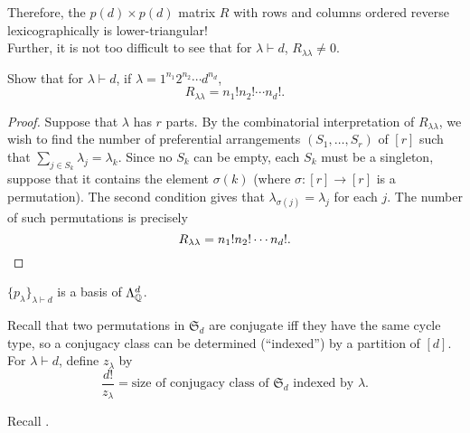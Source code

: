 	Therefore, the $p(d) \times p(d)$ matrix $R$ with rows and columns ordered reverse lexicographically is lower-triangular!\\
	Further, it is not too difficult to see that for $\lambda \vdash d$, $R_{\lambda\lambda} \ne 0$.
	
	\begin{prop}
		Show that for $\lambda \vdash d$, if $\lambda = 1^{n_1}2^{n_2}\cdots d^{n_d}$,
		\[ R_{\lambda\lambda} = n_1! n_2! \cdots n_d!. \]
	\end{prop}
	\begin{proof}
		Suppose that $\lambda$ has $r$ parts. By the combinatorial interpretation of $R_{\lambda\lambda}$, we wish to find the number of preferential arrangements $(S_1,\ldots,S_r)$ of $[r]$ such that $\sum_{j \in S_k} \lambda_j = \lambda_k$. Since no $S_k$ can be empty, each $S_k$ must be a singleton, suppose that it contains the element $\sigma(k)$ (where $\sigma:[r]\to[r]$ is a permutation). The second condition gives that $\lambda_{\sigma(j)} = \lambda_j$ for each $j$. The number of such permutations is precisely
		\[ R_{\lambda\lambda} = n_1! n_2! \cdots n_d!. \qedhere \]
	\end{proof}

	\begin{fcor}
		$\{p_\lambda\}_{\lambda \vdash d}$ is a basis of $\Lambda_{\mathbb{Q}}^d$.
	\end{fcor}

	Recall that two permutations in $\mathfrak{S}_d$ are conjugate iff they have the same cycle type, so a conjugacy class can be determined (``indexed'') by a partition of $[d]$. For $\lambda \vdash d$, define $z_\lambda$ by
	\[ \frac{d!}{z_\lambda} = \text{size of conjugacy class of $\mathfrak{S}_d$ indexed by $\lambda$}. \]

	Recall .

